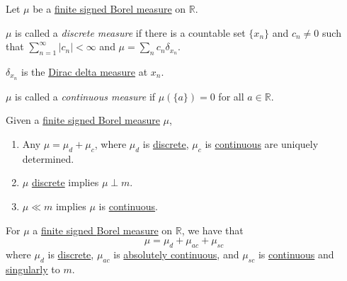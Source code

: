 \begin{definition*}
	Let \(\mu\) be a \hyperref[def:finite-signed-measure]{finite signed \hyperref[def:Borel-measure]{Borel measure}} on \(\mathbb{R}\).
	\begin{definition}\label{def:discrete-measure}
		\(\mu\) is called a \emph{discrete measure} if there is a countable set \(\{x_n\}\) and \(c_n \neq 0\) such that \(\sum_{n=1}^\infty \left\vert c_n \right\vert < \infty\)
		and \(\mu = \sum_n c_n \delta_{x_n}\).
		\begin{note}
			\(\delta_{x_n}\) is the \hyperref[eg:Dirac-Delta measure]{Dirac delta measure} at \(x_n\).
		\end{note}
	\end{definition}
	\begin{definition}\label{def:continuous-measure}
		\(\mu\) is called a \emph{continuous measure} if \(\mu(\{a\}) = 0\) for all \(a \in \mathbb{R}\).
	\end{definition}
\end{definition*}


\begin{lemma}
	Given a \hyperref[def:finite-signed-measure]{finite signed \hyperref[def:Borel-measure]{Borel measure}} \(\mu\),
	\begin{enumerate}[(1)]
		\item Any \(\mu = \mu_d + \mu_c\), where \(\mu_d\) is \hyperref[def:discrete-measure]{discrete}, \(\mu_c\) is \hyperref[def:continuous-measure]{continuous}
		      are uniquely determined.
		\item \(\mu\) \hyperref[def:discrete-measure]{discrete} implies \(\mu \perp m\).
		\item \(\mu \ll m\) implies \(\mu\) is \hyperref[def:continuous-measure]{continuous}.
	\end{enumerate}
\end{lemma}

\begin{corollary}
	For \(\mu \) a \hyperref[def:finite-signed-measure]{finite signed \hyperref[def:Borel-measure]{Borel measure}} on \(\mathbb{R}\), we have that
	\[
		\mu = \mu_d + \mu_{ac} + \mu_{sc}
	\]
	where \(\mu_d\) is \hyperref[def:discrete-measure]{discrete}, \(\mu_{ac}\) is \hyperref[def:absolutely-continuous-function]{absolutely continuous},
	and \(\mu_{sc}\) is \hyperref[def:continuous-measure]{continuous} and \hyperref[def:singular]{singularly} to \(m\).
\end{corollary}

